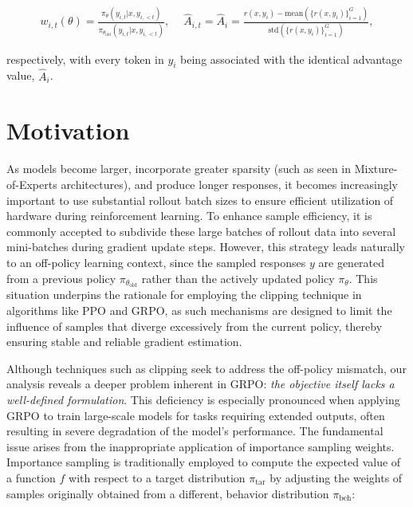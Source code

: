 \begin{align}
    w_{i,t}(\theta)=\frac{ \pi_{\theta} (y_{i,t} | x, y_{i,<t}) }{ \pi_{\theta_\text{old}} (y_{i,t} | x,y_{i,<t})},\quad\ 
    \widehat{A}_{i,t} = \widehat{A}_{i} = \frac{r(x, y_i) - \mathrm{mean} \left( \{ r(x, y_i) \}_{i=1}^G \right) }{ \mathrm{std} \left( \{ r(x, y_i) \}_{i=1}^G \right) },
\end{align}

respectively, with every token in $y_i$ being associated with the identical advantage value, $\widehat{A}_{i}$.

\section{Motivation}
\label{sec:motivation}

As models become larger, incorporate greater sparsity (such as seen in Mixture-of-Experts architectures), and produce longer responses, it becomes increasingly important to use substantial rollout batch sizes to ensure efficient utilization of hardware during reinforcement learning. To enhance sample efficiency, it is commonly accepted to subdivide these large batches of rollout data into several mini-batches during gradient update steps. However, this strategy leads naturally to an off-policy learning context, since the sampled responses $y$ are generated from a previous policy $\pi_{\theta_\text{old}}$ rather than the actively updated policy $\pi_\theta$. This situation underpins the rationale for employing the clipping technique in algorithms like PPO and GRPO, as such mechanisms are designed to limit the influence of samples that diverge excessively from the current policy, thereby ensuring stable and reliable gradient estimation.

Although techniques such as clipping seek to address the off-policy mismatch, our analysis reveals a deeper problem inherent in GRPO: \textit{the objective itself lacks a well-defined formulation}. This deficiency is especially pronounced when applying GRPO to train large-scale models for tasks requiring extended outputs, often resulting in severe degradation of the model's performance. The fundamental issue arises from the inappropriate application of importance sampling weights. Importance sampling is traditionally employed to compute the expected value of a function $f$ with respect to a target distribution $\pi_\text{tar}$ by adjusting the weights of samples originally obtained from a different, behavior distribution $\pi_\text{beh}$:

